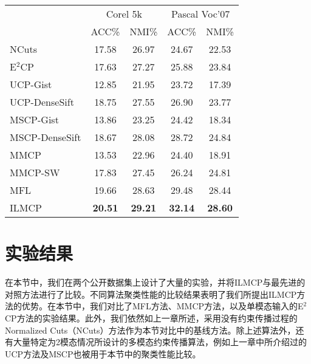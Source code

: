 \begin{table}[h]
	\label{tab4:2modal_notag}
	
	\centering
	\setlength{\tabcolsep}{15pt}
	\begin{tabular}{lcccc}
		\toprule
		&\multicolumn{2}{c}{Corel 5k} & \multicolumn{2}{c}{Pascal Voc'07} \\
		\cmidrule(lr){2-3}
		\cmidrule(lr){4-5}
		& ACC\% & NMI\% & ACC\% & NMI\% \\
		\midrule
		NCuts\cite{shi2000normalized} & 17.58 & 26.97 & 24.67 & 22.53 \\ 
		E$^2$CP\cite{lu2010constrained} & 17.63 & 27.27 & 25.88 & 23.84 \\ 
		UCP-Gist\cite{lu2013unified} & 12.85 & 21.95 & 23.72 & 17.39 \\ 
		UCP-DenseSift\cite{lu2013unified} & 18.75 & 27.55 & 26.90 & 23.77 \\ 
		MSCP-Gist\cite{lu2013exhaustive} & 13.86 & 23.25 & 24.42 & 18.34 \\ 
		MSCP-DenseSift\cite{lu2013exhaustive} & 18.67 & 28.08 & 28.72 & 24.84 \\ 
		MMCP\cite{fu2011multi} & 13.53 & 22.96 & 24.40 & 18.91 \\ 
		MMCP-SW\cite{fu2011multi} & 17.83 & 27.45 & 26.24 & 24.81 \\ 
		MFL & 19.66 & 28.63 & 29.48 & 28.44 \\ 
		ILMCP & \textbf{20.51} & \textbf{29.21} & \textbf{32.14} & \textbf{28.60} \\ 
		\bottomrule
	\end{tabular}
\end{table}

\section{实验结果}
 在本节中，我们在两个公开数据集上设计了大量的实验，并将ILMCP与最先进的对照方法进行了比较。不同算法聚类性能的比较结果表明了我们所提出ILMCP方法的优势。在本节中，我们对比了MFL方法、MMCP\cite{fu2011multi}方法，以及单模态输入的E$^2$CP\cite{lu2010constrained}方法的实验结果。此外，我们依然如上一章所述，采用没有约束传播过程的Normalized Cuts（NCuts）\cite{shi2000normalized}方法作为本节对比中的基线方法。除上述算法外，还有大量特定为2模态情况所设计的多模态约束传播算法，例如上一章中所介绍过的UCP\cite{lu2013unified}方法及MSCP\cite{lu2013exhaustive}也被用于本节中的聚类性能比较。

